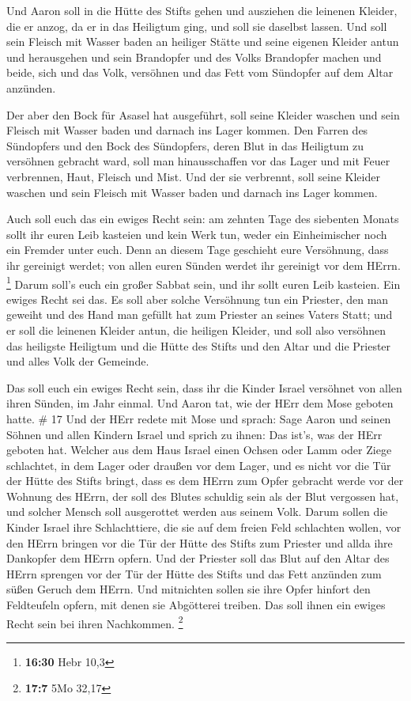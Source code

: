  Und Aaron soll in die Hütte des Stifts gehen und ausziehen
die leinenen Kleider, die er anzog, da er in das Heiligtum ging, und
soll sie daselbst lassen.  Und soll sein Fleisch mit Wasser
baden an heiliger Stätte und seine eigenen Kleider antun und herausgehen
und sein Brandopfer und des Volks Brandopfer machen und beide, sich und
das Volk, versöhnen  und das Fett vom Sündopfer auf dem
Altar anzünden.

 Der aber den Bock für Asasel hat ausgeführt, soll seine
Kleider waschen und sein Fleisch mit Wasser baden und darnach ins Lager
kommen.  Den Farren des Sündopfers und den Bock des
Sündopfers, deren Blut in das Heiligtum zu versöhnen gebracht ward, soll
man hinausschaffen vor das Lager und mit Feuer verbrennen, Haut, Fleisch
und Mist.  Und der sie verbrennt, soll seine Kleider
waschen und sein Fleisch mit Wasser baden und darnach ins Lager kommen.

 Auch soll euch das ein ewiges Recht sein: am zehnten Tage
des siebenten Monats sollt ihr euren Leib kasteien und kein Werk tun,
weder ein Einheimischer noch ein Fremder unter euch.  Denn
an diesem Tage geschieht eure Versöhnung, dass ihr gereinigt werdet; von
allen euren Sünden werdet ihr gereinigt vor dem HErrn. \footnote{\textbf{16:30}
  Hebr 10,3}  Darum soll's euch ein großer Sabbat sein, und
ihr sollt euren Leib kasteien. Ein ewiges Recht sei das. 
Es soll aber solche Versöhnung tun ein Priester, den man geweiht und des
Hand man gefüllt hat zum Priester an seines Vaters Statt; und er soll
die leinenen Kleider antun, die heiligen Kleider,  und soll
also versöhnen das heiligste Heiligtum und die Hütte des Stifts und den
Altar und die Priester und alles Volk der Gemeinde.

 Das soll euch ein ewiges Recht sein, dass ihr die Kinder
Israel versöhnet von allen ihren Sünden, im Jahr einmal. Und Aaron tat,
wie der HErr dem Mose geboten hatte. \# 17  Und der HErr
redete mit Mose und sprach:  Sage Aaron und seinen Söhnen
und allen Kindern Israel und sprich zu ihnen: Das ist's, was der HErr
geboten hat.  Welcher aus dem Haus Israel einen Ochsen oder
Lamm oder Ziege schlachtet, in dem Lager oder draußen vor dem Lager,
 und es nicht vor die Tür der Hütte des Stifts bringt, dass
es dem HErrn zum Opfer gebracht werde vor der Wohnung des HErrn, der
soll des Blutes schuldig sein als der Blut vergossen hat, und solcher
Mensch soll ausgerottet werden aus seinem Volk.  Darum
sollen die Kinder Israel ihre Schlachttiere, die sie auf dem freien Feld
schlachten wollen, vor den HErrn bringen vor die Tür der Hütte des
Stifts zum Priester und allda ihre Dankopfer dem HErrn opfern.
 Und der Priester soll das Blut auf den Altar des HErrn
sprengen vor der Tür der Hütte des Stifts und das Fett anzünden zum
süßen Geruch dem HErrn.  Und mitnichten sollen sie ihre
Opfer hinfort den Feldteufeln opfern, mit denen sie Abgötterei treiben.
Das soll ihnen ein ewiges Recht sein bei ihren Nachkommen. \footnote{\textbf{17:7}
  5Mo 32,17}

